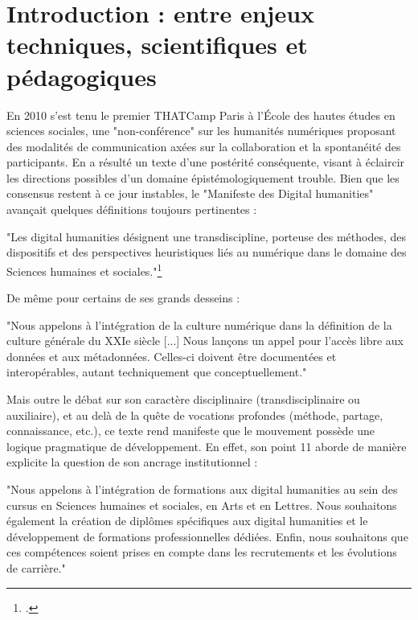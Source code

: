 \documentclass[a4paper,12pt,twoside]{book}
\begin{document}
\printbibliography[keyword={TNAH_hn_logiciels}, heading=subbibliography, title={Humanités numériques : outils et logiciels}]




\mainmatter
\chapter*{Introduction : entre enjeux techniques, scientifiques et pédagogiques}

En 2010 s'est tenu le premier THATCamp Paris à l'École des hautes études en sciences sociales, une "non-conférence" sur les humanités numériques proposant des modalités de communication axées sur la collaboration et la spontanéité des participants. En a résulté un texte d'une postérité conséquente, visant à éclaircir les directions possibles d'un domaine épistémologiquement trouble. Bien que les consensus restent à ce jour instables, le "Manifeste des Digital humanities" avançait quelques définitions toujours pertinentes :

"Les digital humanities désignent une transdiscipline, porteuse des méthodes, des dispositifs et des perspectives heuristiques liés au numérique dans le domaine des Sciences humaines et sociales."\footcite{thatcampparisManifesteDigitalHumanities2010}

De même pour certains de ses grands desseins : 

"Nous appelons à l’intégration de la culture numérique dans la définition de la culture générale du XXIe siècle [...] Nous lançons un appel pour l’accès libre aux données et aux métadonnées. Celles-ci doivent être documentées et interopérables, autant techniquement que conceptuellement." 

Mais outre le débat sur son caractère disciplinaire (transdisciplinaire ou auxiliaire), et au delà de la quête de vocations profondes (méthode, partage, connaissance, etc.), ce texte rend manifeste que le mouvement possède une logique pragmatique de développement. En effet, son point 11 aborde de manière explicite la question de son ancrage institutionnel :

"Nous appelons à l’intégration de formations aux digital humanities au sein des cursus en Sciences humaines et sociales, en Arts et en Lettres. Nous souhaitons également la création de diplômes spécifiques aux digital humanities et le développement de formations professionnelles dédiées. Enfin, nous souhaitons que ces compétences soient prises en compte dans les recrutements et les évolutions de carrière."
\end{document}
